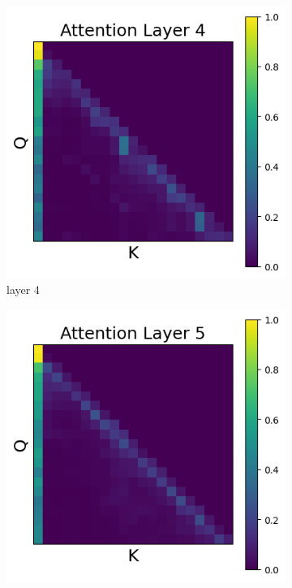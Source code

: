 \documentclass[11pt]{article}
\begin{document}
\begin{figure}[t]
  \begin{subfigure}[t]{0.24\textwidth}
    \centering
    \includegraphics[width=1.4\columnwidth]{figures/intervention5_2/layer_4.png}
    \caption{layer 4}
    \label{fig:obs2_layer4}
  \end{subfigure}\hfill
  \begin{subfigure}[t]{0.24\textwidth}
    \centering
    \includegraphics[width=1.4\columnwidth]{figures/intervention5_2/layer_5.png}

\end{subfigure}
\end{figure}
\end{document}
